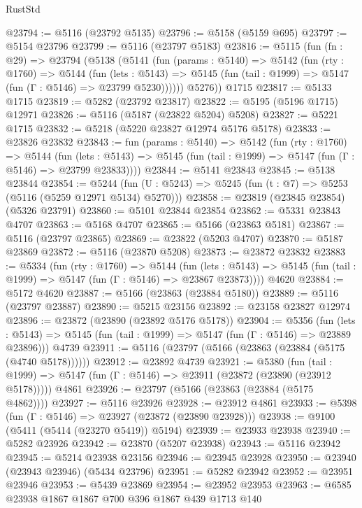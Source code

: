 \begin{lexlean}{RustStd}
\begin{coremodule}
@23794 := @5116 (@23792 @5135)
@23796 := @5158 (@5159 @695)
@23797 := @5154 @23796
@23799 := @5116 (@23797 @5183)
@23816 := @5115
    (fun (fn : @29) =>
    @23794
      (@5138
        (@5141
          (fun (params : @5140) =>
          @5142
            (fun (rty : @1760) =>
            @5144
              (fun (lets : @5143) =>
              @5145 (fun (tail : @1999) => @5147 (fun (Γ : @5146) => @23799 @5230))))))
        @5276))
    @1715
@23817 := @5133 @1715
@23819 := @5282 (@23792 @23817)
@23822 := @5195 (@5196 @1715) @12971
@23826 := @5116 (@5187 (@23822 @5204) @5208)
@23827 := @5221 @1715
@23832 := @5218 (@5220 @23827 @12974 @5176 @5178)
@23833 := @23826 @23832
@23843 := fun (params : @5140) =>
  @5142
    (fun (rty : @1760) =>
    @5144
      (fun (lets : @5143) =>
      @5145 (fun (tail : @1999) => @5147 (fun (Γ : @5146) => @23799 @23833))))
@23844 := @5141 @23843
@23845 := @5138 @23844
@23854 := @5244
    (fun (U : @5243) => @5245 (fun (t : @7) => @5253 (@5116 (@5259 @12971 @5134) @5270)))
@23858 := @23819 (@23845 @23854) (@5326 @23791)
@23860 := @5101 @23844 @23854
@23862 := @5331 @23843 @4707
@23863 := @5168 @4707
@23865 := @5166 (@23863 @5181)
@23867 := @5116 (@23797 @23865)
@23869 := @23822 (@5203 @4707)
@23870 := @5187 @23869
@23872 := @5116 (@23870 @5208)
@23873 := @23872 @23832
@23883 := @5334
    (fun (rty : @1760) =>
    @5144
      (fun (lets : @5143) =>
      @5145 (fun (tail : @1999) => @5147 (fun (Γ : @5146) => @23867 @23873))))
    @4620
@23884 := @5172 @4620
@23887 := @5166 (@23863 (@23884 @5180))
@23889 := @5116 (@23797 @23887)
@23890 := @5215 @23156
@23892 := @23158 @23827 @12974
@23896 := @23872 (@23890 (@23892 @5176 @5178))
@23904 := @5356
    (fun (lets : @5143) => @5145 (fun (tail : @1999) => @5147 (fun (Γ : @5146) => @23889 @23896)))
    @4739
@23911 := @5116 (@23797 (@5166 (@23863 (@23884 (@5175 (@4740 @5178))))))
@23912 := @23892 @4739
@23921 := @5380
    (fun (tail : @1999) => @5147 (fun (Γ : @5146) => @23911 (@23872 (@23890 (@23912 @5178)))))
    @4861
@23926 := @23797 (@5166 (@23863 (@23884 (@5175 @4862))))
@23927 := @5116 @23926
@23928 := @23912 @4861
@23933 := @5398 (fun (Γ : @5146) => @23927 (@23872 (@23890 @23928)))
@23938 := @9100 (@5411 (@5414 (@23270 @5419)) @5194)
@23939 := @23933 @23938
@23940 := @5282 @23926
@23942 := @23870 (@5207 @23938)
@23943 := @5116 @23942
@23945 := @5214 @23938 @23156
@23946 := @23945 @23928
@23950 := @23940 (@23943 @23946) (@5434 @23796)
@23951 := @5282 @23942
@23952 := @23951 @23946
@23953 := @5439 @23869
@23954 := @23952 @23953
@23963 := @6585 @23938 @1867 @1867 @700 @396 @1867 @439 @1713 @140

\end{coremodule}
\end{lexlean}
